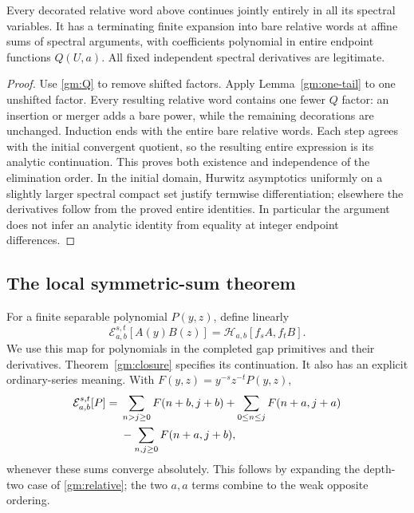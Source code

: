 \begin{theorem}
\label{gm:closure}
Every decorated relative word above continues jointly entirely in all
its spectral variables.  It has a terminating finite expansion into
bare relative words at affine sums of spectral arguments, with
coefficients polynomial in entire endpoint functions \(Q(U,a)\).
All fixed independent spectral derivatives are legitimate.
\end{theorem}

\begin{proof}
Use \eqref{gm:Q} to remove shifted factors.  Apply
Lemma~\ref{gm:one-tail} to one unshifted factor.  Every resulting
relative word contains one fewer \(Q\) factor: an insertion or merger
adds a bare power, while the remaining decorations are unchanged.
Induction ends with the entire bare relative words.  Each step agrees
with the initial convergent quotient, so the resulting entire expression
is its analytic continuation.  This proves both existence and
independence of the elimination order.  In the initial domain, Hurwitz
asymptotics uniformly on a slightly larger spectral compact set justify
termwise differentiation; elsewhere the derivatives follow from the
proved entire identities.  In particular the argument does not infer an
analytic identity from equality at integer endpoint differences.
\end{proof}

\subsection{The local symmetric-sum theorem}

For a finite separable polynomial \(P(y,z)\), define linearly
\begin{equation}\label{gm:E}
 \mathcal E_{a,b}^{s,t}[A(y)B(z)]
       =\mathcal H_{a,b}[f_sA,f_tB].
\end{equation}
We use this map for polynomials in the completed gap primitives and
their derivatives.  Theorem~\ref{gm:closure} specifies its continuation.
It also has an explicit ordinary-series meaning.  With
\(F(y,z)=y^{-s}z^{-t}P(y,z)\),
\begin{align}\label{gm:ordinary-E}
 \mathcal E_{a,b}^{s,t}[P]
 ={}&\sum_{n>j\ge0}F(n+b,j+b)
     +\sum_{0\le n\le j}F(n+a,j+a)\notag\\
    &-\sum_{n,j\ge0}F(n+a,j+b),
\end{align}
whenever these sums converge absolutely.  This follows by expanding
the depth-two case of \eqref{gm:relative}; the two \(a,a\) terms
combine to the weak opposite ordering.

